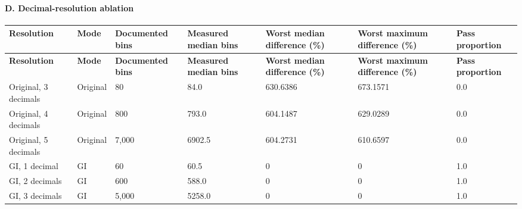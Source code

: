 \documentclass[10pt]{article}
\begin{document}
\begin{landscape}
\paragraph{D. Decimal-resolution ablation}\begin{longtable}{p{2cm}p{1.5cm}p{2cm}p{2.5cm}p{3cm}p{3cm}p{2cm}}
\toprule
\textbf{Resolution} & \textbf{Mode} & \textbf{Documented bins} & \textbf{Measured median bins} & \textbf{Worst median difference (\%)} & \textbf{Worst maximum difference (\%)} & \textbf{Pass proportion} \\
\midrule
\endfirsthead
\toprule
\textbf{Resolution} & \textbf{Mode} & \textbf{Documented bins} & \textbf{Measured median bins} & \textbf{Worst median difference (\%)} & \textbf{Worst maximum difference (\%)} & \textbf{Pass proportion} \\
\midrule
\endhead
Original, 3 decimals & Original & 80 & 84.0 & 630.6386 & 673.1571 & 0.0 \\
Original, 4 decimals & Original & 800 & 793.0 & 604.1487 & 629.0289 & 0.0 \\
Original, 5 decimals & Original & 7,000 & 6902.5 & 604.2731 & 610.6597 & 0.0 \\
GI, 1 decimal & GI & 60 & 60.5 & 0 & 0 & 1.0 \\
GI, 2 decimals & GI & 600 & 588.0 & 0 & 0 & 1.0 \\
GI, 3 decimals & GI & 5,000 & 5258.0 & 0 & 0 & 1.0 \\
\bottomrule
\end{longtable}

\end{landscape}
\end{document}
